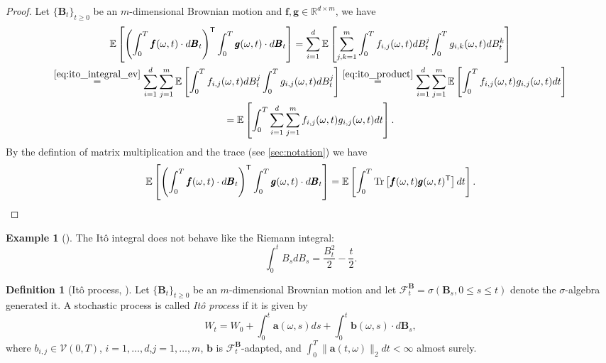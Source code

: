 \documentclass[12pt]{article}
\theoremstyle{definition}
\newtheorem{example}[example]{Example}
\newtheorem{definition}[definition]{Definition}
\numberwithin{equation}{section}
\newcommand{\R}{\mathbb{R}}
\newcommand{\CF}{\mathcal{F}}
\newcommand{\CV}{\mathcal{V}}
\newcommand{\T}{\mathsf{T}}
\newcommand{\ev}[1]{\mathbb{E}\left[{#1}\right]}
\newcommand{\norm}[1]{\lVert{#1}\rVert_2}
\DeclareMathOperator{\Tr}{Tr}
\begin{document}
\begin{proof}
  Let $\{\pmb{B}_t\}_{t\geq0}$ be an $m$-dimensional Brownian motion and $\pmb{f},\pmb{g}  \in \R^{d \times m}$, we have
\begin{multline*}
  \ev{\left(\int_0^T \pmb{f}(\omega, t)\cdot d\pmb{B}_t\right)^\mathsf{T}\int_0^T \pmb{g}(\omega, t)\cdot d\pmb{B}_t}
     = \sum_{i=1}^d \ev{\sum_{j,k=1}^m \int_0^T f_{i,j}(\omega, t)dB_t^j\int_0^T g_{i,k}(\omega, t)dB_t^k}\\
    \overset{\eqref{eq:ito_integral_ev}}{=} \sum_{i=1}^d \sum_{j=1}^m \ev{\int_0^T f_{i,j}(\omega, t)dB_t^j\int_0^T g_{i,j}(\omega, t)dB_t^j} 
    \overset{\eqref{eq:ito_product}}{=} \sum_{i=1}^d \sum_{j=1}^m \ev{\int_0^T f_{i,j}(\omega, t)g_{i,j}(\omega, t)dt} \\
    = \ev{\int_0^T \sum_{i=1}^d \sum_{j=1}^m f_{i,j}(\omega, t)g_{i,j}(\omega, t)dt}.
\end{multline*}
By the defintion of matrix multiplication and the trace (see \autoref{sec:notation}) we have 
\begin{equation*}
    \ev{\left(\int_0^T \pmb{f}(\omega, t)\cdot d\pmb{B}_t\right)^\mathsf{T}\int_0^T \pmb{g}(\omega, t)\cdot d\pmb{B}_t}
    = \ev{\int_0^T \Tr\left[\pmb{f}(\omega, t)\pmb{g}(\omega, t)^\T\right]dt}. \qedhere
\end{equation*}
\end{proof}
\begin{example}[]
  The Itô integral does not behave like the Riemann integral:
  \begin{equation*}
    \int_0^t B_s dB_s = \frac{B_t^2}{2} - \frac{t}{2}.
  \end{equation*}
\end{example}
\begin{definition}[Itô process, ]
  Let $\{\mathbf{B}_t\}_{t\geq 0}$ be an $m$-dimensional Brownian motion and let $\CF_t^\mathbf{B} = \sigma(\mathbf{B}_s, 0 \leq s \leq t)$ denote the $\sigma$-algebra generated it. A stochastic process is called \emph{Itô process} if it is given by
  \begin{equation}
    \label{eq:ito_process}
    W_t = W_0 + \int_0^t\mathbf{a}(\omega,s)ds + \int_0^t \mathbf{b}( \omega,s)\cdot d\mathbf{B}_s,
  \end{equation}
  where $b_{i,j} \in \CV(0,T)$, $i=1,\dots,d$,$j=1,\dots,m$, $\mathbf{b}$ is $\CF_t^\mathbf{B}$-adapted, and $\int_0^T \norm{\mathbf{a}(t, \omega)}dt < \infty$ almost surely.
\end{definition}
\end{document}
